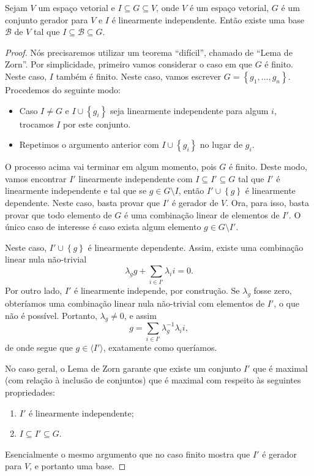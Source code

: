 \begin{theorem}
	Sejam $V$ um espaço vetorial e $I\subseteq G\subseteq V$, onde $V$ é um espaço vetorial, $G$ é um conjunto gerador para $V$ e $I$ é linearmente independente. Então existe uma base $\mathcal{B}$ de $V$ tal que $I\subseteq\mathcal{B}\subseteq G$.
\end{theorem}
\begin{proof}
	Nós precisaremos utilizar um teorema ``difícil'', chamado de ``Lema de Zorn''. Por simplicidade, primeiro vamos considerar o caso em que $G$ é finito. Neste caso, $I$ também é finito. Neste caso, vamos escrever $G=\left\{g_1,\ldots,g_n\right\}$. Procedemos do seguinte modo:
	\begin{itemize}
		\item Caso $I\neq G$ e $I\cup\left\{g_i\right\}$ seja linearmente independente para algum $i$, trocamos $I$ por este conjunto.
		\item Repetimos o argumento anterior com $I\cup\left\{g_i\right\}$ no lugar de $g_i$.
	\end{itemize}
	O processo acima vai terminar em algum momento, pois $G$ é finito. Deste modo, vamos encontrar $I'$ linearmente independente com $I\subseteq I'\subseteq G$ tal que $I'$ é linearmente independente e tal que se $g\in G\setminus I$, então $I'\cup\left\{g\right\}$ é linearmente dependente. Neste caso, basta provar que $I'$ é gerador de $V$. Ora, para isso, basta provar que todo elemento de $G$ é uma combinação linear de elementos de $I'$. O único caso de interesse é caso exista algum elemento $g\in G\setminus I'$.
	
	Neste caso, $I'\cup\left\{g\right\}$ é linearmente dependente. Assim, existe uma combinação linear nula não-trivial
	\[\lambda_g g+\sum_{i\in I'}\lambda_i i=0.\]
	Por outro lado, $I'$ é linearmente independe, por construção. Se $\lambda_g$ fosse zero, obteríamos uma combinação linear nula não-trivial com elementos de $I'$, o que não é possível. Portanto, $\lambda_g\neq 0$, e assim
	\[g=\sum_{i\in I'}\lambda_g^{-1}\lambda_i i,\]
	de onde segue que $g\in\langle I'\rangle$, exatamente como queríamos.
	
	No caso geral, o Lema de Zorn garante que existe um conjunto $I'$ que é maximal (com relação à inclusão de conjuntos) que é maximal com respeito às seguintes propriedades:
	\begin{enumerate}
		\item $I'$ é linearmente independente;
		\item $I\subseteq I'\subseteq G$.
	\end{enumerate}
	Esencialmente o mesmo argumento que no caso finito mostra que $I'$ é gerador para $V$, e portanto uma base.
\end{proof}